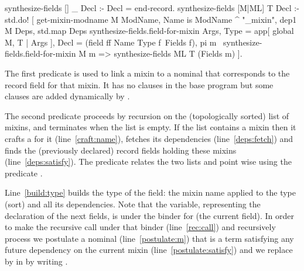 \documentclass[a4paper,UKenglish,cleveref, autoref]{lipics-v2019}
\newcommand{\mixin}{mixin}
\newcommand{\mixins}{mixins}
\theoremstyle{implem}
\theoremstyle{implem}
\theoremstyle{command}
\theoremstyle{commands}
\begin{document}
{{\begin{elpicode}
synthesize-fields [] _ Decl :- Decl = end-record.
synthesize-fields [M|ML] T Decl :- std.do! [
  get-mixin-modname M ModName, Name is ModName ^ "_mixin",                          %
  dep1 M Deps,                                         %
  std.map Deps synthesize-fields.field-for-mixin Args, %
  Type = app[ global M, T | Args ],                    %
  Decl = (field ff Name Type f\ Fields f),
  pi m\                                                %
    synthesize-fields.field-for-mixin M m =>           %
    synthesize-fields ML T (Fields m)                  %
].
\end{elpicode}

The first predicate  is used
to link a \mixin{} to a nominal that corresponds to the record field
for that mixin. It has no clauses in the base program but some clauses
are added dynamically by .

The second predicate proceeds by recursion on the (topologically sorted) list of \mixins{},
and terminates when the list is empty. If the list contains a \mixin{} 
then it crafts a  for it (line~\ref{craft:name}),
fetches its dependencies (line~\ref{deps:fetch}) and
finds the (previously declared) record fields holding these \mixins{}
(line~\ref{deps:satisfy}).
The  predicate relates the two lists  and
 point wise using the predicate .

Line~\ref{build:type} builds the type of the field: the \mixin{} name applied
to the type (sort) and all its dependencies.
Note that the  variable, representing the declaration of the
next fields, is under the binder for  (the current field).
In order to make the recursive call under that binder (line~\ref{rec:call})
and recursively process  we postulate a nominal
 (line~\ref{postulate:m}) that is a term satisfying any
future dependency on the current \mixin{} (line~\ref{postulate:satisfy})
and we replace  by  in  by writing
.


}}
\end{document}
